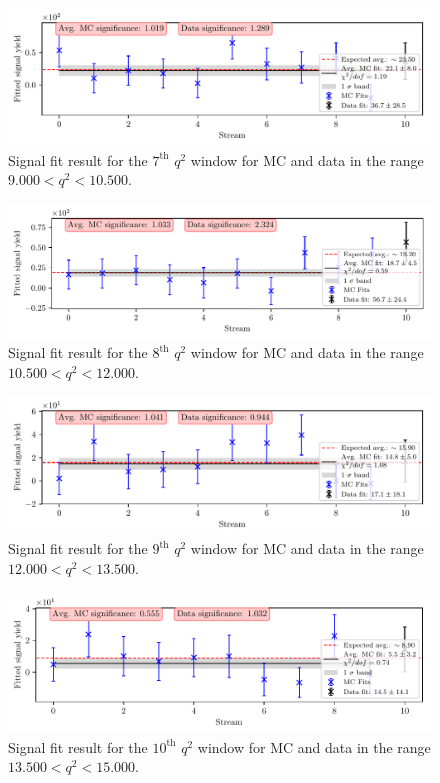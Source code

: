 \begin{figure}[H]
	\centering
	\captionsetup{width=0.8\linewidth}
	\includegraphics[width=\linewidth]{fig/sig_q2_7}
	\caption{Signal fit result for the $7^{\mathrm{th}}$ $q^2$ window for MC and data in the range $9.000  < q^2 < 10.500$.}
\end{figure}

\begin{figure}[H]
	\centering
	\captionsetup{width=0.8\linewidth}
	\includegraphics[width=\linewidth]{fig/sig_q2_8}
	\caption{Signal fit result for the $8^{\mathrm{th}}$ $q^2$ window for MC and data in the range $10.500  < q^2 < 12.000$.}
\end{figure}

\begin{figure}[H]
	\centering
	\captionsetup{width=0.8\linewidth}
	\includegraphics[width=\linewidth]{fig/sig_q2_9}
	\caption{Signal fit result for the $9^{\mathrm{th}}$ $q^2$ window for MC and data in the range $12.000  < q^2 < 13.500$.}
\end{figure}

\begin{figure}[H]
	\centering
	\captionsetup{width=0.8\linewidth}
	\includegraphics[width=\linewidth]{fig/sig_q2_10}
	\caption{Signal fit result for the $10^{\mathrm{th}}$ $q^2$ window for MC and data in the range $13.500  < q^2 < 15.000$.}
\end{figure}

